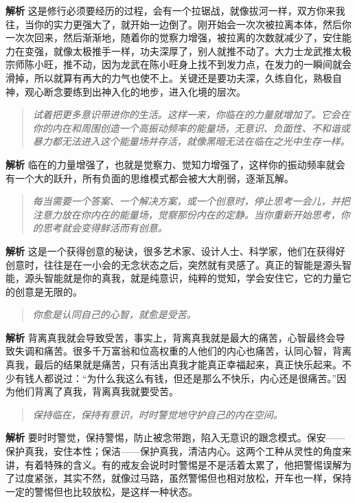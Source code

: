 \textbf{解析} 这是修行必须要经历的过程，会有一个拉锯战，就像拔河一样，双方你来我往，当你的实力更强大了，就开始一边倒了。刚开始会一次次被拉离本体，然后你一次次回来，然后渐渐地，随着你的觉察力增强，被拉离的次数就减少了，安住能力在变强，就像太极推手一样，功夫深厚了，别人就推不动了。大力士龙武推太极宗师陈小旺，推不动，因为龙武在陈小旺身上找不到发力点，在发力的一瞬间就会滑掉，所以就算有再大的力气也使不上。关键还是要功夫深，久练自化，熟极自神，观心断念要练到出神入化的地步，进入化境的层次。

\begin{quote}\it
    试着把更多意识带进你的生活。这样一来，你临在的力量就增加了。它会在你的内在和周围创造一个高振动频率的能量场，无意识、负面性、不和谐或暴力都无法进入这个能量场并存活，就像黑暗无法在临在之光中生存一样。
\end{quote}

\textbf{解析} 临在的力量增强了，也就是觉察力、觉知力增强了，这样你的振动频率就会有一个大的跃升，所有负面的思维模式都会被大大削弱，逐渐瓦解。

\begin{quote}\it
    每当需要一个答案、一个解决方案，或一个创意时，停止思考一会儿，并把注意力放在你内在的能量场，觉察那份内在的定静。当你重新开始思考，你的思考就会变得鲜活而有创意。
\end{quote}

\textbf{解析} 这是一个获得创意的秘诀，很多艺术家、设计人士、科学家，他们在获得好创意时，往往是在一小会的无念状态之后，突然就有灵感了。真正的智能是源头智能，源头智能就是你的真我，就是纯意识，纯粹的觉知，学会安住它，它的力量它的创意是无限的。

\begin{quote}\it
    你愈是认同自己的心智，就愈是受苦。
\end{quote}

\textbf{解析} 背离真我就会导致受苦，事实上，背离真我就是最大的痛苦，心智最终会导致失调和痛苦。很多千万富翁和位高权重的人他们的内心也痛苦，认同心智，背离真我，最后的结果就是痛苦，只有活出真我才能真正幸福起来，真正快乐起来。不少有钱人都说过：“为什么我这么有钱，但还是那么不快乐，内心还是很痛苦。”因为他们背离了真我，背离真我就要受苦。

\begin{quote}\it
    保持临在，保持有意识，时时警觉地守护自己的内在空间。
\end{quote}

\textbf{解析} 要时时警觉，保持警惕，防止被念带跑，陷入无意识的跟念模式。保安——保护真我，安住本性；保洁——保护真我，清洁内心。这两个工种从灵性的角度来讲，有着特殊的含义。有的戒友会说时时警惕是不是活着太累了，他把警惕误解为了过度紧张，其实不然，就像过马路，虽然警惕但也相对放松，开车也一样，保持一定的警惕但也比较放松，是这样一种状态。

